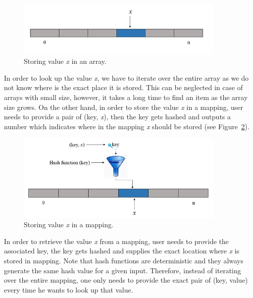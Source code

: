 \begin{figure}[htb!p]
\centering
\includegraphics[width=0.9\textwidth]{Fig/array_1.png}
\caption{\footnotesize{Storing value \emph{x} in an array.}}
\label{fig:array}
\end{figure}

In order to look up the value \emph{x}, we have to iterate over the entire array as we do not know where is the exact place it is stored. This can be neglected in case of arrays with small size, however, it takes a long time to find an item as the array size grows.
On the other hand, in order to store the value \emph{x} in a mapping, user needs to provide a pair of (key, \emph{x}), then the key gets hashed and outputs a number which indicates where in the mapping \emph{x} should be stored (see Figure~\ref{fig:mapping}).
\begin{figure}[htb!p]
\centering
\includegraphics[width=0.9\textwidth]{Fig/mappingFig_2.png}
\caption{\footnotesize{Storing value \emph{x} in a mapping.}\label{tab:store}}
\label{fig:mapping}
\end{figure}
In order to retrieve the value \emph{x} from a mapping, user needs to provide the associated key, the key gets hashed and supplies the exact location where \emph{x} is stored in mapping. Note that hash functions are deterministic and they always generate the same hash value for a given input. Therefore, instead of iterating over the entire mapping, one only needs to provide the exact pair of (key, value) every time he wants to look up that value. 

